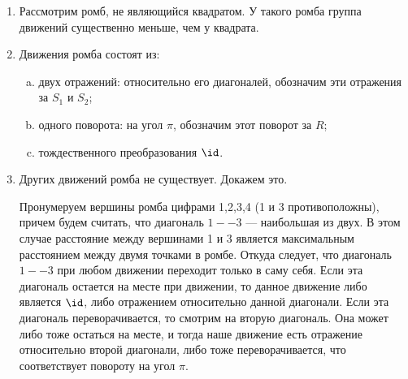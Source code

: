 \begin{enumerate}
\item Рассмотрим ромб, не являющийся квадратом. У такого ромба группа движений существенно меньше, чем у квадрата.
\item Движения ромба состоят из:
\begin{enumerate}[a)]
\item двух отражений: относительно его диагоналей, обозначим эти отражения за $S_1$ и $S_2$;
\item одного поворота: на угол $\pi$, обозначим этот поворот за $R$;
\item тождественного преобразования $\id$.
\end{enumerate}
\item Других движений ромба не существует. Докажем это.

Пронумеруем вершины ромба цифрами 1,2,3,4 (1 и 3 противоположны), причем будем считать, что диагональ $1--3$ --- наибольшая из двух. В этом случае расстояние между вершинами 1 и 3 является максимальным расстоянием между двумя точками в ромбе. Откуда следует, что диагональ $1--3$ при любом движении переходит только в саму себя. Если эта диагональ остается на месте при движении, то данное движение либо является $\id$, либо отражением относительно данной диагонали. Если эта диагональ переворачивается, то смотрим на вторую диагональ. Она может либо тоже остаться на месте, и тогда наше движение есть отражение относительно второй диагонали, либо тоже переворачивается, что соответствует повороту на угол $\pi$.


\end{enumerate}
